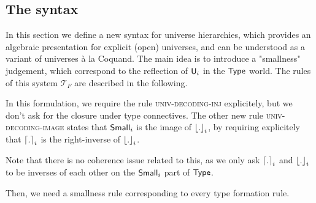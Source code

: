 \documentclass{article}
\begin{document}
\subsection{The syntax} \label{rules}

In this section we define a new syntax for universe hierarchies, which provides an
algebraic presentation for explicit (open) universes, and can be understood as a
variant of universes à la Coquand.  The main idea is to introduce a "smallness"
judgement, which correspond to the reflection of $\textsf{U}_i$ in the $\textsf{Type}$ world.
The rules of this system $\mathcal{T}_F$ are described in the following.

In this formulation, we require the rule \textsc{univ-decoding-inj} explicitely, but we don't ask for the closure under type connectives. The other new rule \textsc{univ-decoding-image} states that $\textsf{Small}_i$ is the image of $\left\lfloor . \right\rfloor_i$, by requiring explicitely that $\left\lceil . \right\rceil_i$ is the right-inverse of $\left\lfloor . \right\rfloor_i$.

Note that there is no coherence issue related to this, as we only ask $\left\lceil . \right\rceil_i$ and $\left\lfloor . \right\rfloor_i$ to be inverses of each other on the $\textsf{Small}_i$ part of $\textsf{Type}$.


Then, we need a smallness rule corresponding to every type formation rule.
\end{document}
